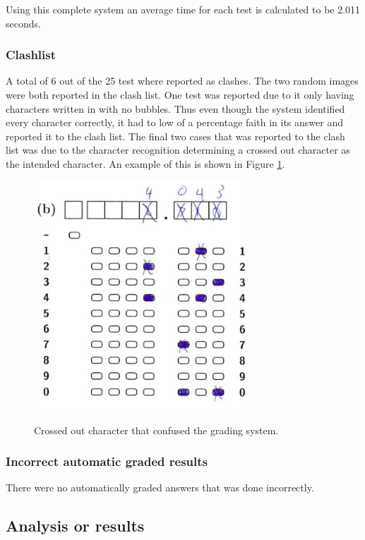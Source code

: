 Using this complete system an average time for each test is calculated to be 2.011 seconds. 

\subsubsection{Clashlist}

A total of 6 out of the 25 test where reported as clashes. The two random images were both reported in the clash list. One test was reported due to it only having characters written in with no bubbles. Thus even though the system identified every character correctly, it had to low of a percentage faith in its answer and reported it to the clash list. The final two cases that was reported to the clash list was due to the character recognition determining a crossed out character as the intended character. An example of this is shown in Figure \ref{fig:crossedOutCharacter}.

\begin{figure}
  \centering
  \includegraphics[width=8cm]{crossedOutCharacter}\\
  \caption{Crossed out character that confused the grading system.}
  \label{fig:crossedOutCharacter}
\end{figure}

\subsubsection{Incorrect automatic graded results}

There were no automatically graded answers that was done incorrectly.

\subsection{Analysis or results}


